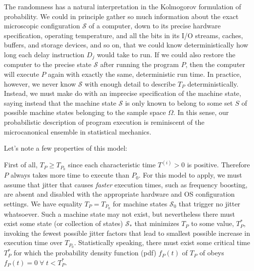 \documentclass[conference]{IEEEtran}
\begin{document}
The randomness has a natural interpretation in the Kolmogorov formulation of probability. We could in principle gather so much information about the exact microscopic configuration $\mathcal S$ of a computer, down to its precise hardware specification, operating temperature, and all the bits in its I/O streams, caches, buffers, and storage devices, and so on, that we could know deterministically how long each delay instruction $D_j$ would take to run. If we could also restore the computer to the precise state $\mathcal S$ after running the program $P$, then the computer will execute $P$ again with exactly the same, deterministic run time. In practice, however, we never know $\mathcal S$ with enough detail to describe $T_P$ deterministically. Instead, we must make do with an imprecise specification of the machine state, saying instead that the machine state $\mathcal S$ is only known to belong to some set $S$ of possible machine states belonging to the sample space $\Omega$. In this sense, our probabilistic description of program execution is reminiscent of the microcanonical ensemble in statistical mechanics.

Let's note a few properties of this model:

First of all, $T_P \ge T_{P_0}$ since each characteristic time $T^{(i)} > 0$ is positive. Therefore $P$ always takes more time to execute than $P_0$.
For this model to apply, we must assume that jitter that causes \textit{faster}
execution times, such as frequency boosting, are absent and disabled with the
appropriate hardware and OS configuration settings. We have equality $T_P = T_{P_0}$
for machine states $\mathcal S_0$ that trigger no jitter whatsoever. Such a machine state may not exist, but nevertheless there must exist some state (or collection of states) $\mathcal S_*$ that minimizes $T_P$ to some value, $T^*_P$, invoking the fewest possible jitter factors that lead to smallest possible increase in execution time over $T_{P_0}$.
Statistically speaking, there must exist some critical time $T^*_P$ for which the probability density function (pdf) $f_P(t)$ of $T_P$ of obeys $f_P(t) = 0 \; \forall \; t < T^*_P$.
\end{document}
